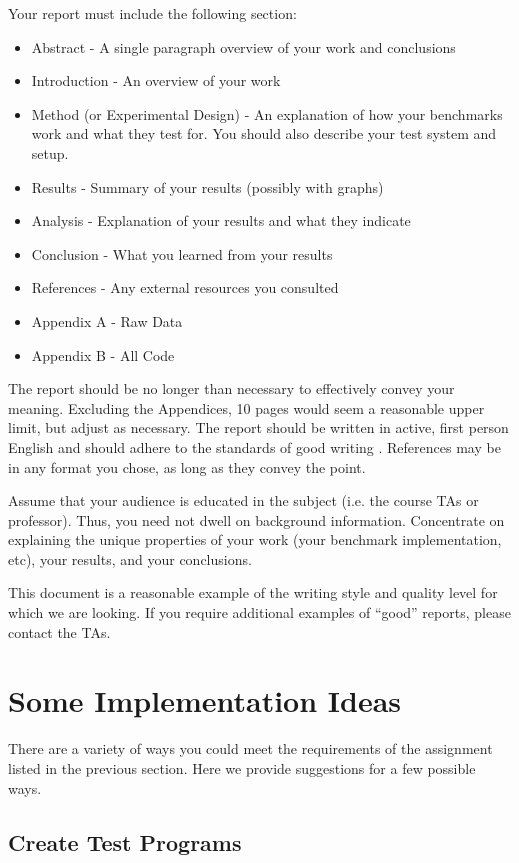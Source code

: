 \documentclass[12pt]{article}
\begin{document}
Your report must include the following section:

\begin{itemize}
\item Abstract - A single paragraph overview of your work and conclusions
\item Introduction - An overview of your work
\item Method (or Experimental Design) - An explanation of how your
benchmarks work and what they test for. You should also describe your
test system and setup.
\item Results - Summary of your results (possibly with graphs)
\item Analysis - Explanation of your results and what they indicate
\item Conclusion - What you learned from your results
\item References - Any external resources you consulted
\item Appendix A - Raw Data
\item Appendix B - All Code
\end{itemize}

The report should be no longer than necessary to effectively convey your
meaning. Excluding the Appendices, 10 pages would seem a reasonable
upper limit, but adjust as necessary. The report should be written in
active, first person English and should adhere to the standards of good
writing \cite{StrunkWhite,K&R}. References may be in any format you chose,
as long as they convey the point.

Assume that your audience is educated in the subject
(i.e. the course TAs or professor). Thus, you need not dwell on
background information. Concentrate on explaining the unique properties of
your work (your benchmark implementation, etc), your results, and your
conclusions.

This document is a reasonable example of the writing
style and quality level for which we are looking. If you require
additional examples of ``good'' reports, please contact the TAs.

\section{Some Implementation Ideas}

There are a variety of ways you could meet the requirements of the
assignment listed in the previous section. Here we provide suggestions
for a few possible ways.

\subsection{Create Test Programs}
\end{document}
